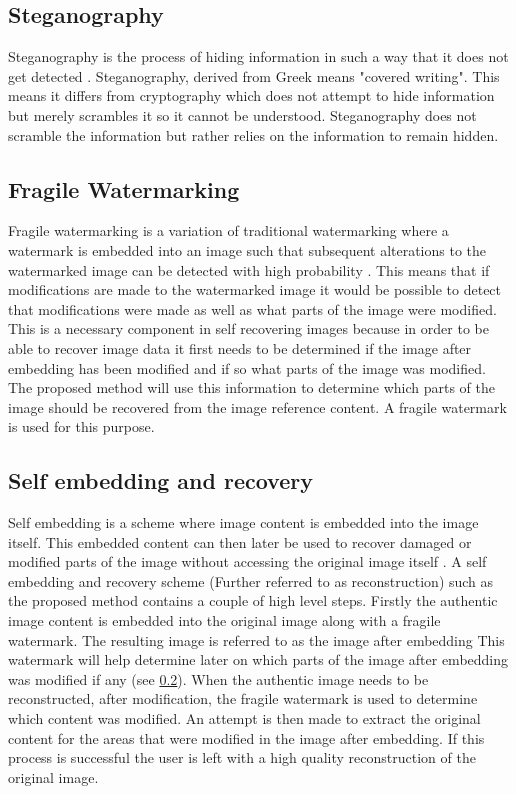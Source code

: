 \documentclass[12pt]{article}
\begin{document}
\subsection{Steganography}
\label{introSteganography}
Steganography is the process of hiding information in such a way that it does not get detected \cite{johnson1998exploring}.
Steganography, derived from Greek means "covered writing".
This means it differs from cryptography which does not attempt to hide information but merely scrambles it so it cannot be understood.
Steganography does not scramble the information but rather relies on the information to remain hidden. 

\subsection{Fragile Watermarking}
\label{introFragWatermarking}
Fragile watermarking is a variation of traditional watermarking where a watermark is embedded into an image such that subsequent alterations to the watermarked image can be detected with high probability \cite{lin1999review}.
This means that if modifications are made to the watermarked image it would be possible to detect that modifications were made as well as what parts of the image were modified.
This is a necessary component in self recovering images because in order to be able to recover image data it first needs to be determined if the image after embedding has been modified and if so what parts of the image was modified.
The proposed method will use this information to determine which parts of the image should be recovered from the image reference content.
A fragile watermark is used for this purpose. 

\subsection{Self embedding and recovery}
\label{introSelfEmbedRecovery}
Self embedding is a scheme where image content is embedded into the image itself. This embedded content can then later be used to recover damaged or modified parts of the image without accessing the original image itself \cite{fridrich1999images}.
A self embedding and recovery scheme (Further referred to as reconstruction) such as the proposed method contains a couple of high level steps.
Firstly the authentic image content is embedded into the original image along with a fragile watermark.
The resulting image is referred to as the image after embedding
This watermark will help determine later on which parts of the image after embedding was modified if any (see \ref{introFragWatermarking}).
When the authentic image needs to be reconstructed, after modification, the fragile watermark is used to determine which content was modified.
An attempt is then made to extract the original content for the areas that were modified in the image after embedding.
If this process is successful the user is left with a high quality reconstruction of the original image.
\end{document}

